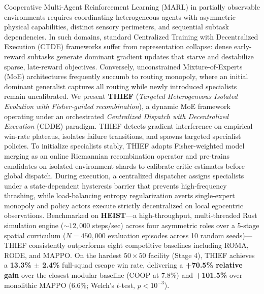 Cooperative Multi-Agent Reinforcement Learning (MARL) in partially observable environments requires coordinating heterogeneous agents with asymmetric physical capabilities, distinct sensory perimeters, and sequential subtask dependencies. In such domains, standard Centralized Training with Decentralized Execution (CTDE) frameworks suffer from representation collapse: dense early-reward subtasks generate dominant gradient updates that starve and destabilize sparse, late-reward objectives. Conversely, unconstrained Mixture-of-Experts (MoE) architectures frequently succumb to routing monopoly, where an initial dominant generalist captures all routing while newly introduced specialists remain uncalibrated. We present \textbf{THIEF} (\emph{Targeted Heterogeneous Isolated Evolution with Fisher-guided recombination}), a dynamic MoE framework operating under an orchestrated \emph{Centralized Dispatch with Decentralized Execution} (CDDE) paradigm. THIEF detects gradient interference on empirical win-rate plateaus, isolates failure transitions, and spawns targeted specialist policies. To initialize specialists stably, THIEF adapts Fisher-weighted model merging as an online Riemannian recombination operator and pre-trains candidates on isolated environment shards to calibrate critic estimates before global dispatch. During execution, a centralized dispatcher assigns specialists under a state-dependent hysteresis barrier that prevents high-frequency thrashing, while load-balancing entropy regularization averts single-expert monopoly and policy actors execute strictly decentralized on local egocentric observations. Benchmarked on \textbf{HEIST}---a high-throughput, multi-threaded Rust simulation engine ($\sim 12,\!000$ steps/sec) across four asymmetric roles over a 5-stage spatial curriculum ($N=450,\!000$ evaluation episodes across 10 random seeds)---THIEF consistently outperforms eight competitive baselines including ROMA, RODE, and MAPPO. On the hardest $50 \times 50$ facility (Stage 4), THIEF achieves a \textbf{13.3\% $\pm$ 2.4\%} full-squad escape win rate, delivering a \textbf{+70.5\% relative gain} over the closest modular baseline (COOP at 7.8\%) and \textbf{+101.5\%} over monolithic MAPPO (6.6\%; Welch's $t$-test, $p < 10^{-3}$).
